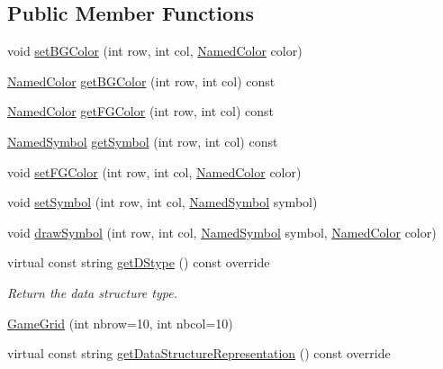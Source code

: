 \subsection*{Public Member Functions}
\begin{DoxyCompactItemize}
\item 
void \hyperlink{classbridges_1_1game_1_1_game_grid_a141dbed75aeb34498ee0f8ad17c2cb6c}{set\+B\+G\+Color} (int row, int col, \hyperlink{namespacebridges_1_1game_afaa832a4322b25b6a4ebfba832f10f26}{Named\+Color} color)
\item 
\hyperlink{namespacebridges_1_1game_afaa832a4322b25b6a4ebfba832f10f26}{Named\+Color} \hyperlink{classbridges_1_1game_1_1_game_grid_ae63280e78a80eb0fe72050afa8ef2a63}{get\+B\+G\+Color} (int row, int col) const
\item 
\hyperlink{namespacebridges_1_1game_afaa832a4322b25b6a4ebfba832f10f26}{Named\+Color} \hyperlink{classbridges_1_1game_1_1_game_grid_a6d38c8ac0d4ccbdd1b2b1c5d2f445d9a}{get\+F\+G\+Color} (int row, int col) const
\item 
\hyperlink{namespacebridges_1_1game_ab9a19c7ab6e2ebac2f95180e21733487}{Named\+Symbol} \hyperlink{classbridges_1_1game_1_1_game_grid_aac18709133e1e2e6e77708779cabc553}{get\+Symbol} (int row, int col) const
\item 
void \hyperlink{classbridges_1_1game_1_1_game_grid_add272657d570437edc849eb7cfd061fb}{set\+F\+G\+Color} (int row, int col, \hyperlink{namespacebridges_1_1game_afaa832a4322b25b6a4ebfba832f10f26}{Named\+Color} color)
\item 
void \hyperlink{classbridges_1_1game_1_1_game_grid_aaca03d00599251edb5312e9ba51dd62e}{set\+Symbol} (int row, int col, \hyperlink{namespacebridges_1_1game_ab9a19c7ab6e2ebac2f95180e21733487}{Named\+Symbol} symbol)
\item 
void \hyperlink{classbridges_1_1game_1_1_game_grid_a32c5c19c1dff8d50001d2aa57cbda70b}{draw\+Symbol} (int row, int col, \hyperlink{namespacebridges_1_1game_ab9a19c7ab6e2ebac2f95180e21733487}{Named\+Symbol} symbol, \hyperlink{namespacebridges_1_1game_afaa832a4322b25b6a4ebfba832f10f26}{Named\+Color} color)
\item 
virtual const string \hyperlink{classbridges_1_1game_1_1_game_grid_a07da19700a077e3d0f2cde2cade2ba60}{get\+D\+Stype} () const override
\begin{DoxyCompactList}\small\item\em Return the data structure type. \end{DoxyCompactList}\item 
\hyperlink{classbridges_1_1game_1_1_game_grid_a00d0b39cd640fe338a96961ca1793191}{Game\+Grid} (int nbrow=10, int nbcol=10)
\item 
virtual const string \hyperlink{classbridges_1_1game_1_1_game_grid_aefbf4969375a174cefd8e2edf9fb6900}{get\+Data\+Structure\+Representation} () const override
\end{DoxyCompactItemize}
